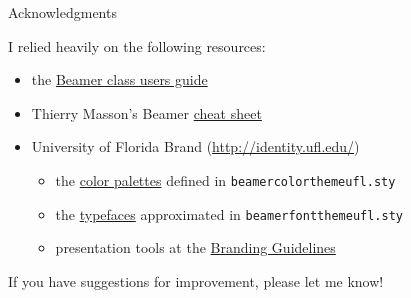 \documentclass{beamer}
\begin{document}
\begin{frame}{Acknowledgments}
\label{slide:acknowledgments}

I relied heavily on the following resources:
\begin{itemize}
\item the \href{http://texdoc.net/texmf-dist/doc/latex/beamer/doc/beameruserguide.pdf}{Beamer class users guide}
\item Thierry Masson's Beamer \href{http://www.cpt.univ-mrs.fr/~masson/latex/Beamer-appearance-cheat-sheet.pdf}{cheat sheet}
\item University of Florida Brand (\url{http://identity.ufl.edu/})
\begin{itemize}
\item the \href{http://identity.ufl.edu/color/}{color palettes} defined in {\tt beamercolorthemeufl.sty}
\item the \href{http://identity.ufl.edu/typography/}{typefaces} approximated in {\tt beamerfontthemeufl.sty}
\item presentation tools at the \href{http://identity.ufl.edu/our-brand/}{Branding Guidelines}
\end{itemize}
\end{itemize}

\vfill
If you have suggestions for improvement, please let me know!

\center\href{https://github.com/corybrunson/beamerthemeufl/issues}{}

\end{frame}
\end{document}
